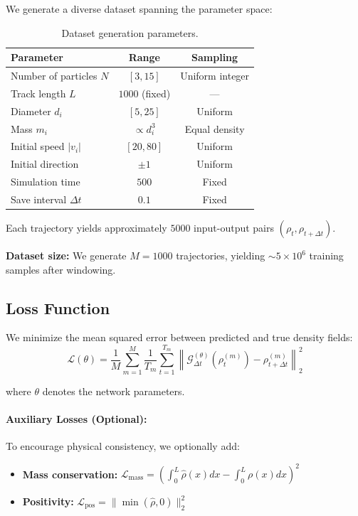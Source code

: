 \documentclass[11pt]{article}
\begin{document}
We generate a diverse dataset spanning the parameter space:
\begin{table}[h]
\centering
\begin{tabular}{lcc}
\toprule
\textbf{Parameter} & \textbf{Range} & \textbf{Sampling} \\
\midrule
Number of particles $N$ & $[3, 15]$ & Uniform integer \\
Track length $L$ & $1000$ (fixed) & --- \\
Diameter $d_i$ & $[5, 25]$ & Uniform \\
Mass $m_i$ & $\propto d_i^3$ & Equal density \\
Initial speed $|v_i|$ & $[20, 80]$ & Uniform \\
Initial direction & $\pm 1$ & Uniform \\
Simulation time & $500$ & Fixed \\
Save interval $\Delta t$ & $0.1$ & Fixed \\
\bottomrule
\end{tabular}
\caption{Dataset generation parameters.}
\label{tab:dataset}
\end{table}

Each trajectory yields approximately $5000$ input-output pairs $(\rho_t, \rho_{t+\Delta t})$.

\textbf{Dataset size:} We generate $M = 1000$ trajectories, yielding $\sim 5 \times 10^6$ training samples after windowing.

\subsection{Loss Function}

We minimize the mean squared error between predicted and true density fields:
\begin{equation}
    \mathcal{L}(\theta) = \frac{1}{M} \sum_{m=1}^{M} \frac{1}{T_m} \sum_{t=1}^{T_m} \left\| \mathcal{G}_{\Delta t}^{(\theta)}(\rho_t^{(m)}) - \rho_{t+\Delta t}^{(m)} \right\|_2^2
\end{equation}

where $\theta$ denotes the network parameters.

\paragraph{Auxiliary Losses (Optional):}
To encourage physical consistency, we optionally add:
\begin{itemize}
    \item \textbf{Mass conservation:} $\mathcal{L}_{\text{mass}} = \left( \int_0^L \hat{\rho}(x) dx - \int_0^L \rho(x) dx \right)^2$
    \item \textbf{Positivity:} $\mathcal{L}_{\text{pos}} = \| \min(\hat{\rho}, 0) \|_2^2$
\end{itemize}
\end{document}
